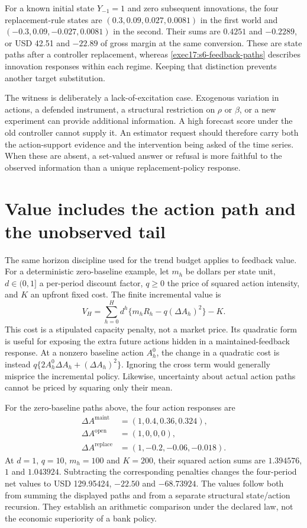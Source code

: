 For a known initial state $Y_{-1}=1$ and zero subsequent innovations, the
four replacement-rule states are $(0.3,0.09,0.027,0.0081)$ in the first
world and $(-0.3,0.09,-0.027,0.0081)$ in the second. Their sums are
$0.4251$ and $-0.2289$, or USD 42.51 and $-22.89$ of gross margin at
the same conversion. These are state paths after a controller replacement,
whereas \eqref{exec17:s6-feedback-paths} describes innovation responses
within each regime. Keeping that distinction prevents another target
substitution.

The witness is deliberately a lack-of-excitation case. Exogenous variation
in actions, a defended instrument, a structural restriction on $\rho$ or
$\beta$, or a new experiment can provide additional information. A high
forecast score under the old controller cannot supply it. An estimator
request should therefore carry both the action-support evidence and the
intervention being asked of the time series. When these are absent, a
set-valued answer or refusal is more faithful to the observed information
than a unique replacement-policy response.

\section{Value includes the action path and the unobserved tail}
\label{exec17:s6-value}

The same horizon discipline used for the trend budget applies to feedback
value. For a deterministic zero-baseline example, let $m_h$ be dollars per
state unit, $d\in(0,1]$ a per-period discount factor, $q\geq0$ the price
of squared action intensity, and $K$ an upfront fixed cost. The finite
incremental value is
\begin{equation}
 V_H=\sum_{h=0}^{H}d^h\{m_hR_h-q(\Delta A_h)^2\}-K.
 \label{exec17:s6-finite-value}
\end{equation}
This cost is a stipulated capacity penalty, not a market price. Its
quadratic form is useful for exposing the extra future actions hidden in
a maintained-feedback response. At a nonzero baseline action $A_h^0$,
the change in a quadratic cost is instead
$q\{2A_h^0\Delta A_h+(\Delta A_h)^2\}$. Ignoring the cross term
would generally misprice the incremental policy. Likewise, uncertainty
about actual action paths cannot be priced by squaring only their mean.

For the zero-baseline paths above, the four action responses are
\begin{align}
 \Delta A^{\mathrm{maint}}&=(1,0.4,0.36,0.324),\nonumber\\
 \Delta A^{\mathrm{open}}&=(1,0,0,0),\nonumber\\
 \Delta A^{\mathrm{replace}}&=(1,-0.2,-0.06,-0.018).
 \label{exec17:s6-action-paths}
\end{align}
At $d=1$, $q=10$, $m_h=100$ and $K=200$, their squared action sums
are $1.394576$, $1$ and $1.043924$. Subtracting the corresponding
penalties changes the four-period net values to USD 129.95424,
$-22.50$ and $-68.73924$. The values follow both from summing the
displayed paths and from a separate structural state/action recursion.
They establish an arithmetic comparison under the declared law, not the
economic superiority of a bank policy.\citep{exec17_s6_math}

